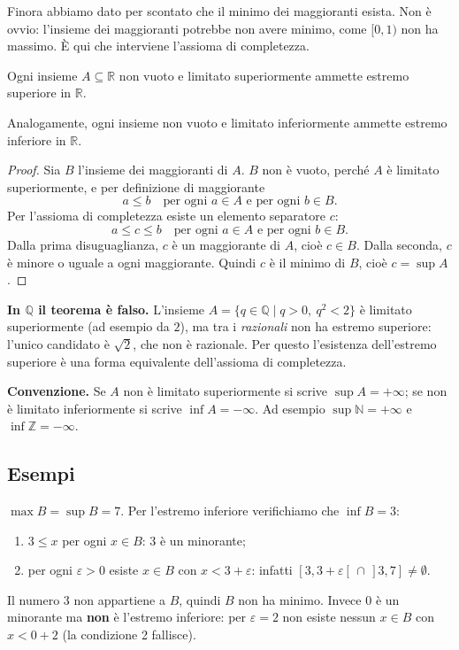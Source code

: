 \documentclass[11pt,a4paper]{article}
\begin{document}
Finora abbiamo dato per scontato che il minimo dei maggioranti esista. Non è
ovvio: l'insieme dei maggioranti potrebbe non avere minimo, come $[0, 1)$ non
ha massimo. È qui che interviene l'assioma di completezza.

\begin{teorema}
Ogni insieme $A \subseteq \mathbb{R}$ non vuoto e limitato superiormente
ammette estremo superiore in $\mathbb{R}$.

Analogamente, ogni insieme non vuoto e limitato inferiormente ammette
estremo inferiore in $\mathbb{R}$.
\end{teorema}

\begin{proof}
Sia $B$ l'insieme dei maggioranti di $A$. $B$ non è vuoto, perché $A$ è
limitato superiormente, e per definizione di maggiorante
\[
a \leq b \quad \text{per ogni } a \in A \text{ e per ogni } b \in B.
\]
Per l'assioma di completezza esiste un elemento separatore $c$:
\[
a \leq c \leq b \quad \text{per ogni } a \in A \text{ e per ogni } b \in B.
\]
Dalla prima disuguaglianza, $c$ è un maggiorante di $A$, cioè $c \in B$.
Dalla seconda, $c$ è minore o uguale a ogni maggiorante. Quindi $c$ è il
minimo di $B$, cioè $c = \sup A$.
\end{proof}

\textbf{In $\mathbb{Q}$ il teorema è falso.} L'insieme
$A = \{q \in \mathbb{Q} \mid q > 0,\ q^2 < 2\}$ è limitato superiormente
(ad esempio da $2$), ma tra i \emph{razionali} non ha estremo superiore:
l'unico candidato è $\sqrt{2}$, che non è razionale. Per questo l'esistenza
dell'estremo superiore è una forma equivalente dell'assioma di completezza.


\textbf{Convenzione.} Se $A$ non è limitato superiormente si scrive
$\sup A = +\infty$; se non è limitato inferiormente si scrive
$\inf A = -\infty$. Ad esempio $\sup \mathbb{N} = +\infty$ e
$\inf \mathbb{Z} = -\infty$.

\subsection{Esempi}

\begin{esempio}[L'insieme $B$]
$\max B = \sup B = 7$. Per l'estremo inferiore verifichiamo che $\inf B = 3$:
\begin{enumerate}
    \item $3 \leq x$ per ogni $x \in B$: $3$ è un minorante;
    \item per ogni $\varepsilon > 0$ esiste $x \in B$ con $x < 3 + \varepsilon$:
          infatti $[3, 3 + \varepsilon[ \,\cap\, ]3, 7] \neq \emptyset$.
\end{enumerate}
Il numero $3$ non appartiene a $B$, quindi $B$ non ha minimo. Invece $0$ è
un minorante ma \textbf{non} è l'estremo inferiore: per $\varepsilon = 2$ non
esiste nessun $x \in B$ con $x < 0 + 2$ (la condizione 2 fallisce).
\end{esempio}
\end{document}
